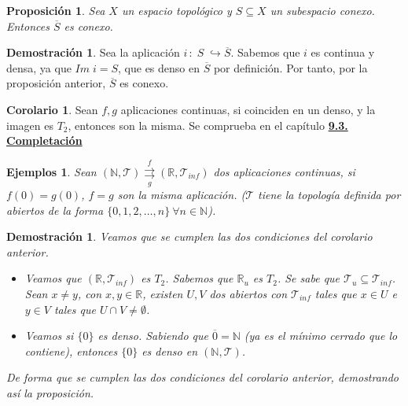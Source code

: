 \documentclass[12pt,twoside]{report}
\newcommand\mc[1]{\mathcal{#1}}
\theoremstyle{azul}
\newtheorem*{demx}{Demostración}
\newtheorem*{ejex}{Ejemplos}
\theoremstyle{azul2}
\theoremstyle{plain}
\newtheorem*{prop}{Proposición}
\theoremstyle{definition}
\newtheorem*{dem}{Demostración}
\newtheorem*{cor}{Corolario}
\theoremstyle{remark}
\begin{document}
\begin{prop}\label{propito}
Sea $X$ un espacio topológico y $S \subseteq X$ un subespacio conexo. Entonces $\overline{S}$ es conexo.
\end{prop}
\begin{dem}
Sea la aplicación $i\,:\; S \; \hookrightarrow \overline{S}$. Sabemos que $i$ es continua y densa, ya que $Im \; i = S$, que es denso en $\overline{S}$ por definición. Por tanto, por la proposición anterior, $\overline{S}$ es conexo.
\end{dem}
\begin{cor}
Sean $f,g$ aplicaciones continuas, si coinciden en un denso, y la imagen es $T_2$, entonces son la misma. Se comprueba en el capítulo \hyperref[densaplic]{\textbf{9.3. Completación }} 
\end{cor}
\begin{ejex}
Sean $(\mathbb{N}, \mc{T}) \underset{g}{\overset{f}{\rightrightarrows}} (\mathbb{R}, \mc{T}_{inf})$ dos aplicaciones continuas, si $f(0)=g(0)$, $f=g$ son la misma aplicación. ($\mc{T}$ tiene la topología definida por abiertos de la forma $\{0, 1, 2, \ldots, n \} \: \forall n \in \mathbb{N}$). 
\end{ejex}
\begin{demx} Veamos que se cumplen las dos condiciones del corolario anterior.
\vspace{-5mm}
\begin{itemize}
    \item Veamos que $(\mathbb{R}, \mc{T}_{inf})$ es $T_2$. Sabemos que $\mathbb{R}_u$ es $T_2$. Se sabe que $\mc{T}_u \subseteq \mc{T}_{inf}$. Sean $x \neq y$, con $x,y \in \mathbb{R}$, existen $U, V$ dos abiertos con $\mc{T}_{inf}$ tales que $x \in U$ e $y \in V$ tales que $U \cap V \neq \emptyset$. 
    \item Veamos si $\{0\}$ es denso. Sabiendo que $\overline{0}=\mathbb{N}$ (ya es el mínimo cerrado que lo contiene), entonces $\{0\}$ es denso en $(\mathbb{N}, \mc{T})$.
\end{itemize} \vspace{-5mm}
De forma que se cumplen las dos condiciones del corolario anterior, demostrando así la proposición.
\end{demx}
\end{document}

